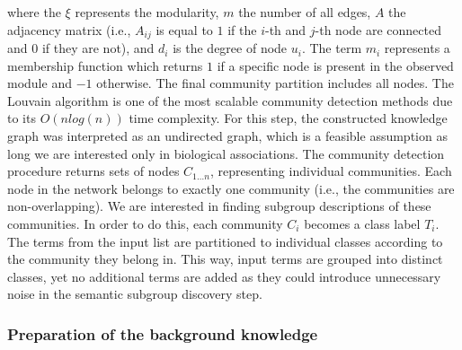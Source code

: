 \documentclass[oribibl,runningheads,a4paper]{llncs}
\begin{document}
\noindent where the $\xi$ represents the modularity, $m$ the number of all edges, $A$ the adjacency matrix (i.e., $A_{ij}$ is equal to $1$ if the $i$-th and $j$-th node are connected and $0$ if they are not), and $d_{i}$ is the degree of node $u_i$. The term $m_i$  represents a membership function which returns $1$ if a specific node is present in the observed module and $-1$ otherwise. The final community partition includes all nodes. The Louvain algorithm is one of the most scalable community detection methods due to its $O(nlog(n))$ time complexity. For this step, the constructed knowledge graph was interpreted as an undirected graph, which is a feasible assumption as long we are interested only in biological associations. The community detection procedure returns sets of nodes $C_{1\dots n}$, representing individual communities. Each node in the network belongs to exactly one community (i.e., the communities are non-overlapping). We are interested in finding subgroup descriptions of these communities. In order to do this, each community $C_i$ becomes a class label $T_i$. The terms from the input list are partitioned to individual classes according to the community they belong in. This way, input terms are grouped into distinct classes, yet no additional terms are added as they could introduce unnecessary noise in the semantic subgroup discovery step.

\subsubsection{Preparation of the background knowledge}
\end{document}
